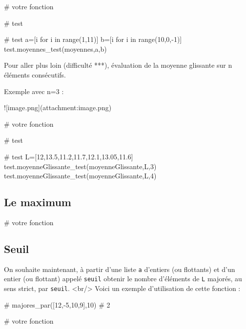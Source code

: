 \begin{multicols}{2}
{# votre fonction


# test

# test
a=[i for i in range(1,11)]
b=[i for i in range(10,0,-1)]
test.moyennes_test(moyennes,a,b)

Pour aller plus loin (difficulté ***), évaluation de la moyenne glissante sur n éléments consécutifs.

Exemple avec n=3 :

![image.png](attachment:image.png)


# votre fonction

# test

# test
L=[12,13.5,11.2,11.7,12.1,13.05,11.6]
test.moyenneGlissante_test(moyenneGlissante,L,3)
test.moyenneGlissante_test(moyenneGlissante,L,4)

\subsection*{Le maximum}

# votre fonction

\subsection*{Seuil}

On souhaite maintenant, à partir d'une liste \texttt{a}
 d'entiers (ou flottants) et d'un entier (ou flottant) appelé \texttt{seuil} obtenir le nombre 
 d'éléments de \texttt{L} majorés, au sens strict, par \texttt{seuil}. <br/>
 Voici un exemple d'utilisation de cette fonction :

# majores_par([12,-5,10,9],10)
# 2


# votre fonction        

}
\end{multicols}
